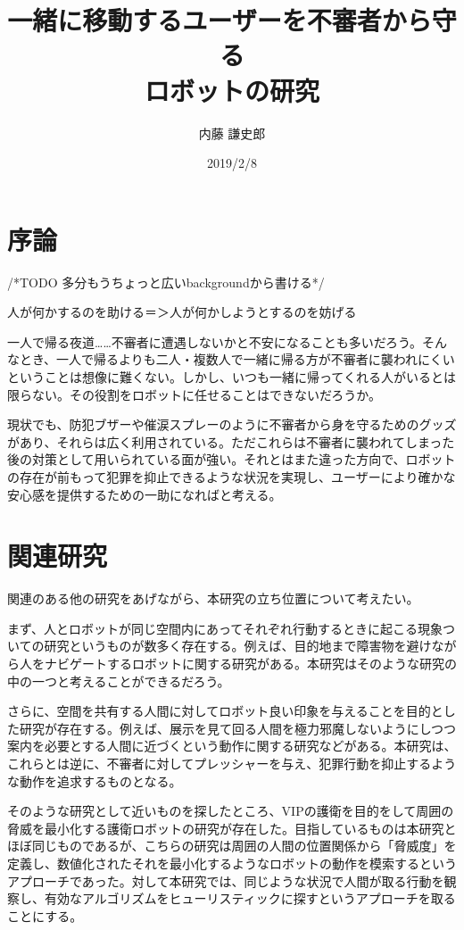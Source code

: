 \documentclass{kuthesis}
\title{一緒に移動するユーザーを不審者から守る\\ロボットの研究}
\author{内藤 謙史郎}
\date{2019/2/8}
\begin{document}
\maketitle

\tableofcontents
\newpage

\section{序論}

/*TODO 多分もうちょっと広いbackgroundから書ける*/

人が何かするのを助ける＝＞人が何かしようとするのを妨げる

一人で帰る夜道……不審者に遭遇しないかと不安になることも多いだろう。そんなとき、一人で帰るよりも二人・複数人で一緒に帰る方が不審者に襲われにくいということは想像に難くない。しかし、いつも一緒に帰ってくれる人がいるとは限らない。その役割をロボットに任せることはできないだろうか。

現状でも、防犯ブザーや催涙スプレーのように不審者から身を守るためのグッズがあり、それらは広く利用されている。ただこれらは不審者に襲われてしまった後の対策として用いられている面が強い。それとはまた違った方向で、ロボットの存在が前もって犯罪を抑止できるような状況を実現し、ユーザーにより確かな安心感を提供するための一助になればと考える。

\section{関連研究}
関連のある他の研究をあげながら、本研究の立ち位置について考えたい。

まず、人とロボットが同じ空間内にあってそれぞれ行動するときに起こる現象ついての研究というものが数多く存在する。例えば、目的地まで障害物を避けながら人をナビゲートするロボットに関する研究がある\cite{1}。本研究はそのような研究の中の一つと考えることができるだろう。

さらに、空間を共有する人間に対してロボット良い印象を与えることを目的とした研究が存在する。例えば、展示を見て回る人間を極力邪魔しないようにしつつ案内を必要とする人間に近づくという動作に関する研究\cite{2}などがある。本研究は、これらとは逆に、不審者に対してプレッシャーを与え、犯罪行動を抑止するような動作を追求するものとなる。

そのような研究として近いものを探したところ、VIPの護衛を目的をして周囲の脅威を最小化する護衛ロボットの研究\cite{3}が存在した。目指しているものは本研究とほぼ同じものであるが、こちらの研究\cite{3}は周囲の人間の位置関係から「脅威度」を定義し、数値化されたそれを最小化するようなロボットの動作を模索するというアプローチであった。対して本研究では、同じような状況で人間が取る行動を観察し、有効なアルゴリズムをヒューリスティックに探すというアプローチを取ることにする。
\end{document}
